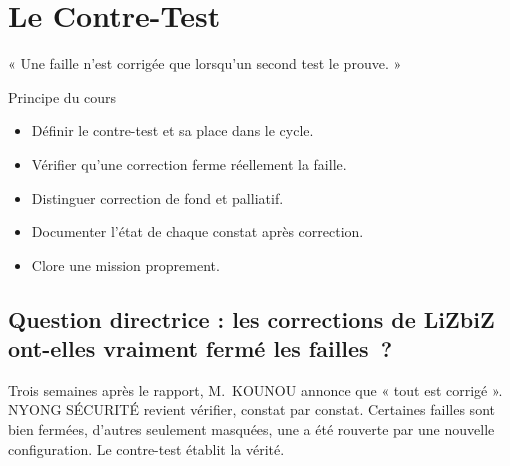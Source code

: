 
\chapter{Le Contre-Test}
\label{chap:retest}

\epigraph{%
    « Une faille n'est corrigée que lorsqu'un second test le prouve. »%
}{Principe du cours}


\begin{boxobjectifs}
\begin{itemize}
    \item Définir le contre-test et sa place dans le cycle.
    \item Vérifier qu'une correction ferme réellement la faille.
    \item Distinguer correction de fond et palliatif.
    \item Documenter l'état de chaque constat après correction.
    \item Clore une mission proprement.
\end{itemize}
\end{boxobjectifs}

\bigskip

\section*{Question directrice : les corrections de LiZbiZ ont-elles vraiment fermé les failles~?}

Trois semaines après le rapport, M.~KOUNOU annonce que « tout est corrigé ».
NYONG SÉCURITÉ revient vérifier, constat par constat. Certaines failles sont
bien fermées, d'autres seulement masquées, une a été rouverte par une
nouvelle configuration. Le contre-test établit la vérité.

